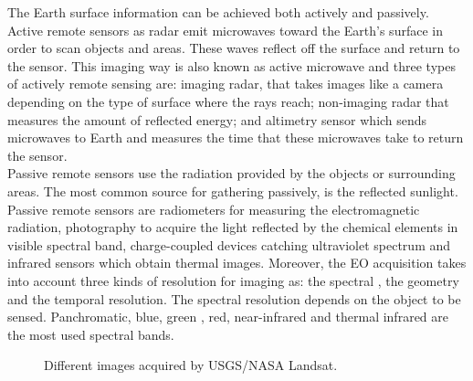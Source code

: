 The Earth surface information can be achieved both actively  and
passively. Active remote sensors as radar emit microwaves toward the Earth's
surface in order to scan objects and areas. These waves reflect off the surface and return to the sensor. This imaging
way is also known as active microwave and three types of actively remote sensing
are: imaging radar, that takes images like a camera depending on the type of
surface where the rays reach; non-imaging radar that measures the amount of reflected energy; and altimetry
sensor which sends microwaves to Earth and measures the time that these
microwaves take to return the sensor.\\
Passive remote sensors use the radiation provided by the objects or surrounding areas. The most common source for gathering passively, is the reflected
sunlight. \\
Passive remote sensors are radiometers for measuring the
electromagnetic radiation, photography to acquire the light reflected by the
chemical elements in visible spectral band, charge-coupled devices catching
ultraviolet spectrum and infrared sensors which obtain thermal images.
Moreover, the \ac{EO} acquisition takes into account three kinds of resolution
for imaging as: the spectral , the geometry and the temporal resolution. The
spectral resolution depends on the object to be sensed. Panchromatic, blue, green , red,
near-infrared and thermal infrared are the
most used spectral bands. 

\begin{figure*}
\begin{center}
 \hspace{0.05\textwidth}
\caption{Different images acquired by \acs{USGS}/\acs{NASA} Landsat.}
\end{center}
\end{figure*}


